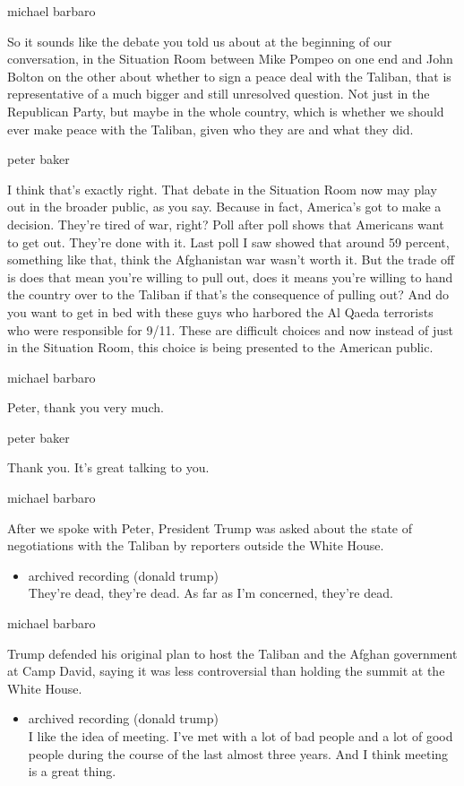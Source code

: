 michael barbaro

So it sounds like the debate you told us about at the beginning of our
conversation, in the Situation Room between Mike Pompeo on one end and
John Bolton on the other about whether to sign a peace deal with the
Taliban, that is representative of a much bigger and still unresolved
question. Not just in the Republican Party, but maybe in the whole
country, which is whether we should ever make peace with the Taliban,
given who they are and what they did.

peter baker

I think that's exactly right. That debate in the Situation Room now may
play out in the broader public, as you say. Because in fact, America's
got to make a decision. They're tired of war, right? Poll after poll
shows that Americans want to get out. They're done with it. Last poll I
saw showed that around 59 percent, something like that, think the
Afghanistan war wasn't worth it. But the trade off is does that mean
you're willing to pull out, does it means you're willing to hand the
country over to the Taliban if that's the consequence of pulling out?
And do you want to get in bed with these guys who harbored the Al Qaeda
terrorists who were responsible for 9/11. These are difficult choices
and now instead of just in the Situation Room, this choice is being
presented to the American public.

michael barbaro

Peter, thank you very much.

peter baker

Thank you. It's great talking to you.

michael barbaro

After we spoke with Peter, President Trump was asked about the state of
negotiations with the Taliban by reporters outside the White House.

\begin{itemize}
\tightlist
\item
  archived recording (donald trump)\\
  They're dead, they're dead. As far as I'm concerned, they're dead.
\end{itemize}

michael barbaro

Trump defended his original plan to host the Taliban and the Afghan
government at Camp David, saying it was less controversial than holding
the summit at the White House.

\begin{itemize}
\tightlist
\item
  archived recording (donald trump)\\
  I like the idea of meeting. I've met with a lot of bad people and a
  lot of good people during the course of the last almost three years.
  And I think meeting is a great thing.
\end{itemize}

